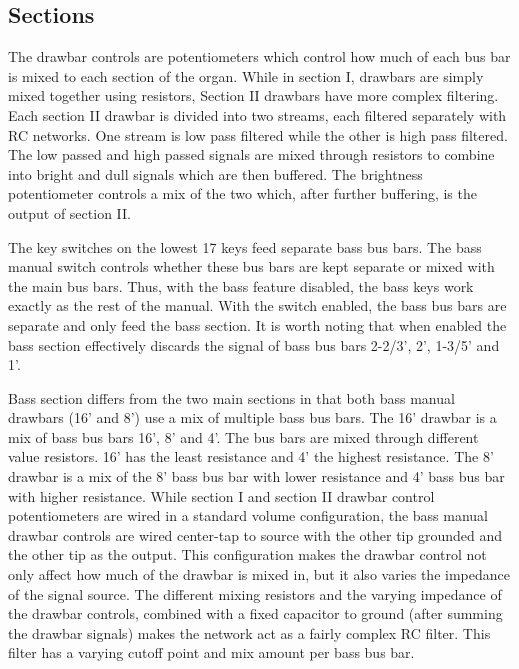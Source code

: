 \documentclass[11pt,a4paper]{article}
\begin{document}
\subsection{Sections}
\label{section:sections}

The drawbar controls are potentiometers which control how much of each bus bar is mixed to each section of the organ. While in section I, drawbars are simply mixed together using resistors, Section II drawbars have more complex filtering. Each section II drawbar is divided into two streams, each filtered separately with RC networks. One stream is low pass filtered while the other is high pass filtered. The low passed and high passed signals are mixed through resistors to combine into bright and dull signals which are then buffered. The brightness potentiometer controls a mix of the two which, after further buffering, is the output of section II. 

The key switches on the lowest 17 keys feed separate bass bus bars. The bass manual switch controls whether these bus bars are kept separate or mixed with the main bus bars. Thus, with the bass feature disabled, the bass keys work exactly as the rest of the manual. With the switch enabled, the bass bus bars are separate and only feed the bass section. It is worth noting that when enabled the bass section effectively discards the signal of bass bus bars 2-2/3', 2', 1-3/5' and 1'.

Bass section differs from the two main sections in that both bass manual drawbars (16' and 8') use a mix of multiple bass bus bars. The 16' drawbar is a mix of bass bus bars 16', 8' and 4'. The bus bars are mixed through different value resistors. 16' has the least resistance and 4' the highest resistance. The 8' drawbar is a mix of the 8' bass bus bar with lower resistance and 4' bass bus bar with higher resistance. While section I and section II drawbar control potentiometers are wired in a standard volume configuration, the bass manual drawbar controls are wired center-tap to source with the other tip grounded and the other tip as the output. This configuration makes the drawbar control not only affect how much of the drawbar is mixed in, but it also varies the impedance of the signal source. The different mixing resistors and the varying impedance of the drawbar controls, combined with a fixed capacitor to ground (after summing the drawbar signals) makes the network act as a fairly complex RC filter. This filter has a varying cutoff point and mix amount per bass bus bar.
\end{document}
